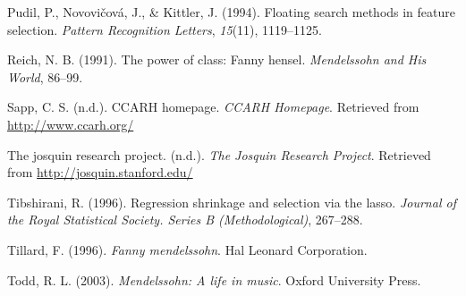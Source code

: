 \documentclass[12pt,twoside]{reedthesis}
\theoremstyle{definition}
\theoremstyle{definition}
\theoremstyle{definition}
\theoremstyle{remark}
\begin{document}
\hypertarget{ref-pudil1994floating}{}
Pudil, P., Novovičová, J., \& Kittler, J. (1994). Floating search
methods in feature selection. \emph{Pattern Recognition Letters},
\emph{15}(11), 1119--1125.

\hypertarget{ref-reich1991}{}
Reich, N. B. (1991). The power of class: Fanny hensel. \emph{Mendelssohn
and His World}, 86--99.

\hypertarget{ref-sapp}{}
Sapp, C. S. (n.d.). CCARH homepage. \emph{CCARH Homepage}. Retrieved
from \url{http://www.ccarh.org/}

\hypertarget{ref-jrp}{}
The josquin research project. (n.d.). \emph{The Josquin Research
Project}. Retrieved from \url{http://josquin.stanford.edu/}

\hypertarget{ref-lasso}{}
Tibshirani, R. (1996). Regression shrinkage and selection via the lasso.
\emph{Journal of the Royal Statistical Society. Series B
(Methodological)}, 267--288.

\hypertarget{ref-tillard1996}{}
Tillard, F. (1996). \emph{Fanny mendelssohn}. Hal Leonard Corporation.

\hypertarget{ref-todd2003}{}
Todd, R. L. (2003). \emph{Mendelssohn: A life in music}. Oxford
University Press.


\end{document}
